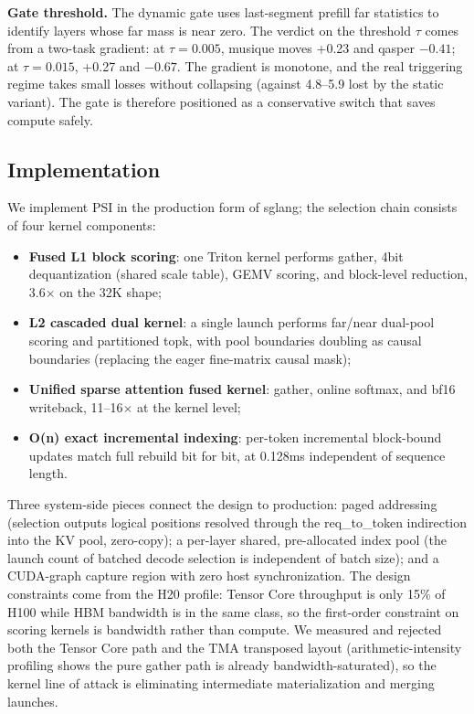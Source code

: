 \documentclass[11pt]{article}
\begin{document}
\textbf{Gate threshold.} The dynamic gate uses last-segment prefill far statistics to identify layers whose far mass is near zero. The verdict on the threshold $\tau$ comes from a two-task gradient: at $\tau{=}0.005$, musique moves +0.23 and qasper $-0.41$; at $\tau{=}0.015$, +0.27 and $-0.67$. The gradient is monotone, and the real triggering regime takes small losses without collapsing (against 4.8--5.9 lost by the static variant). The gate is therefore positioned as a conservative switch that saves compute safely.

\subsection{Implementation}

We implement PSI in the production form of sglang; the selection chain consists of four kernel components:
\begin{itemize}
\item \textbf{Fused L1 block scoring}: one Triton kernel performs gather, 4bit dequantization (shared scale table), GEMV scoring, and block-level reduction, 3.6$\times$ on the 32K shape;
\item \textbf{L2 cascaded dual kernel}: a single launch performs far/near dual-pool scoring and partitioned topk, with pool boundaries doubling as causal boundaries (replacing the eager fine-matrix causal mask);
\item \textbf{Unified sparse attention fused kernel}: gather, online softmax, and bf16 writeback, 11--16$\times$ at the kernel level;
\item \textbf{O(n) exact incremental indexing}: per-token incremental block-bound updates match full rebuild bit for bit, at 0.128ms independent of sequence length.
\end{itemize}
Three system-side pieces connect the design to production: paged addressing (selection outputs logical positions resolved through the req\_to\_token indirection into the KV pool, zero-copy); a per-layer shared, pre-allocated index pool (the launch count of batched decode selection is independent of batch size); and a CUDA-graph capture region with zero host synchronization. The design constraints come from the H20 profile: Tensor Core throughput is only 15\% of H100 while HBM bandwidth is in the same class, so the first-order constraint on scoring kernels is bandwidth rather than compute. We measured and rejected both the Tensor Core path and the TMA transposed layout (arithmetic-intensity profiling shows the pure gather path is already bandwidth-saturated), so the kernel line of attack is eliminating intermediate materialization and merging launches.
\end{document}
